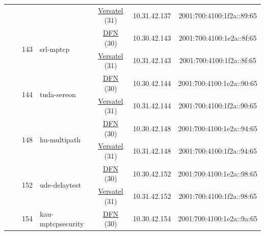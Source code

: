 \begin{small}
\begin{center}
\begin{longtable}{|c|c|c|c|c|c|c|c|}
  &  &  &  & \multicolumn{2}{|c|}{\tiny{\href{http://www.versatel.de}{Versatel} (31)}} & \tiny{10.31.42.137} & \tiny{2001:700:4100:1f2a::89:65} \\* \cline{3-3}\cline{4-4}\cline{5-5}\cline{6-6}\cline{7-7}\cline{8-8}
  &  & \multirow{2}{*}{\tiny{143}} & \multicolumn{1}{|l|}{\multirow{2}{*}{\tiny{srl-mptcp}}} & \multicolumn{2}{|c|}{\tiny{\href{https://www.dfn.de}{DFN} (30)}} & \tiny{10.30.42.143} & \tiny{2001:700:4100:1e2a::8f:65} \\* \cline{5-5}\cline{6-6}\cline{7-7}\cline{8-8}
  &  &  &  & \multicolumn{2}{|c|}{\tiny{\href{http://www.versatel.de}{Versatel} (31)}} & \tiny{10.31.42.143} & \tiny{2001:700:4100:1f2a::8f:65} \\* \cline{3-3}\cline{4-4}\cline{5-5}\cline{6-6}\cline{7-7}\cline{8-8}
  &  & \multirow{2}{*}{\tiny{144}} & \multicolumn{1}{|l|}{\multirow{2}{*}{\tiny{tuda-sereon}}} & \multicolumn{2}{|c|}{\tiny{\href{https://www.dfn.de}{DFN} (30)}} & \tiny{10.30.42.144} & \tiny{2001:700:4100:1e2a::90:65} \\* \cline{5-5}\cline{6-6}\cline{7-7}\cline{8-8}
  &  &  &  & \multicolumn{2}{|c|}{\tiny{\href{http://www.versatel.de}{Versatel} (31)}} & \tiny{10.31.42.144} & \tiny{2001:700:4100:1f2a::90:65} \\* \cline{3-3}\cline{4-4}\cline{5-5}\cline{6-6}\cline{7-7}\cline{8-8}
  &  & \multirow{2}{*}{\tiny{148}} & \multicolumn{1}{|l|}{\multirow{2}{*}{\tiny{hu-multipath}}} & \multicolumn{2}{|c|}{\tiny{\href{https://www.dfn.de}{DFN} (30)}} & \tiny{10.30.42.148} & \tiny{2001:700:4100:1e2a::94:65} \\* \cline{5-5}\cline{6-6}\cline{7-7}\cline{8-8}
  &  &  &  & \multicolumn{2}{|c|}{\tiny{\href{http://www.versatel.de}{Versatel} (31)}} & \tiny{10.31.42.148} & \tiny{2001:700:4100:1f2a::94:65} \\* \cline{3-3}\cline{4-4}\cline{5-5}\cline{6-6}\cline{7-7}\cline{8-8}
  &  & \multirow{2}{*}{\tiny{152}} & \multicolumn{1}{|l|}{\multirow{2}{*}{\tiny{ude-delaytest}}} & \multicolumn{2}{|c|}{\tiny{\href{https://www.dfn.de}{DFN} (30)}} & \tiny{10.30.42.152} & \tiny{2001:700:4100:1e2a::98:65} \\* \cline{5-5}\cline{6-6}\cline{7-7}\cline{8-8}
  &  &  &  & \multicolumn{2}{|c|}{\tiny{\href{http://www.versatel.de}{Versatel} (31)}} & \tiny{10.31.42.152} & \tiny{2001:700:4100:1f2a::98:65} \\* \cline{3-3}\cline{4-4}\cline{5-5}\cline{6-6}\cline{7-7}\cline{8-8}
  &  & \multirow{2}{*}{\tiny{154}} & \multicolumn{1}{|l|}{\multirow{2}{*}{\tiny{kau-mptcpsecurity}}} & \multicolumn{2}{|c|}{\tiny{\href{https://www.dfn.de}{DFN} (30)}} & \tiny{10.30.42.154} & \tiny{2001:700:4100:1e2a::9a:65} \\* \cline{5-5}\cline{6-6}\cline{7-7}\cline{8-8}

\end{longtable}
\end{center}
\end{small}
